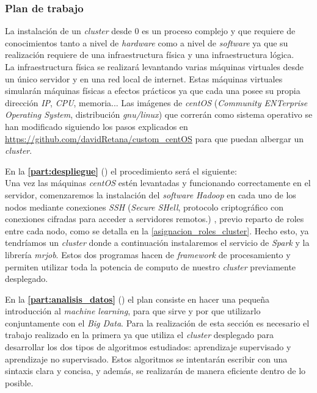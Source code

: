 \subsubsection*{Plan de trabajo}
La instalación de un \textit{cluster} desde 0 es un proceso complejo y que requiere de conocimientos tanto a nivel de 
\textit{hardware} como a nivel de \textit{software} ya que su realización requiere de una infraestructura física 
y una infraestructura lógica.\\
La infraestructura física se realizará levantando varias máquinas virtuales desde un único servidor y en una red local
de internet. Estas máquinas virtuales simularán máquinas físicas a efectos prácticos ya que cada una posee su propia
dirección \textit{IP}, \textit{CPU}, memoria...
Las imágenes de \textit{centOS} (\textit{Community ENTerprise Operating System}, distribución \textit{gnu/linux}) 
que correrán como sistema operativo se han modificado siguiendo los pasos explicados
en \url{https://github.com/davidRetana/custom_centOS} para que puedan albergar un \textit{cluster}.
\newline

\noindent En la \textbf{\autoref{part:despliegue}} () el procedimiento será el siguiente:\\
Una vez las máquinas \textit{centOS} estén levantadas y funcionando correctamente en el servidor, comenzaremos la
instalación del \textit{software Hadoop} en cada uno de los nodos mediante conexiones \textit{SSH} 
(\textit{Secure SHell}, protocolo criptográfico con conexiones cifradas para acceder a servidores remotos.)
, previo reparto de roles entre cada nodo, como se detalla en la \autoref{asignacion_roles_cluster}.
Hecho esto, ya tendríamos un \textit{cluster} donde a continuación instalaremos el servicio de \textit{Spark} y la 
librería \textit{mrjob}. Estos dos programas hacen de \textit{framework} de procesamiento y permiten utilizar
toda la potencia de computo de nuestro \textit{cluster} previamente desplegado.
\newline

\noindent En la \textbf{\autoref{part:analisis_datos}} () el plan consiste en hacer
una pequeña introducción al \textit{machine learning}, para que sirve y por que utilizarlo conjuntamente con el 
\textit{Big Data}. Para la realización de esta sección es necesario el trabajo realizado en la primera 
ya que utiliza el \textit{cluster} desplegado para desarrollar los dos tipos de algoritmos estudiados: 
aprendizaje supervisado y aprendizaje no supervisado. Estos algoritmos se intentarán escribir con una sintaxis 
clara y concisa, y además, se realizarán de manera eficiente dentro de lo posible.



